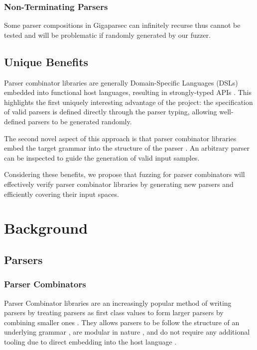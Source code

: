 \documentclass[11pt]{article}
\begin{document}
\subsubsection{Non-Terminating Parsers}
Some parser compositions in Gigaparsec can infinitely recurse thus cannot be tested and will be problematic if randomly generated by our fuzzer.

\subsection{Unique Benefits}
Parser combinator libraries are generally Domain-Specific Languages (DSLs) embedded into functional host languages, resulting in strongly-typed APIs \cite{monadic-combinators, parsec}. This highlights the first uniquely interesting advantage of the project: the specification of valid parsers is defined directly through the parser typing, allowing well-defined parsers to be generated randomly.

The second novel aspect of this approach is that parser combinator libraries embed the target grammar into the structure of the parser \cite{combinator-parsing}. An arbitrary parser can be inspected to guide the generation of valid input samples.

Considering these benefits, we propose that fuzzing for parser combinators will effectively verify parser combinator libraries by generating new parsers and efficiently covering their input spaces.

\section{Background} %

\subsection{Parsers}
\subsubsection{Parser Combinators}
Parser Combinator libraries are an increasingly popular method of writing parsers by treating parsers as first class values to form larger parsers by combining smaller ones \cite{parsley}. They allows parsers to be follow the structure of an underlying grammar \cite{efficient-combinators}, are modular in nature \cite{efficient-combinators}, and do not require any additional tooling due to direct embedding into the host language \cite{parsec}.
\end{document}
